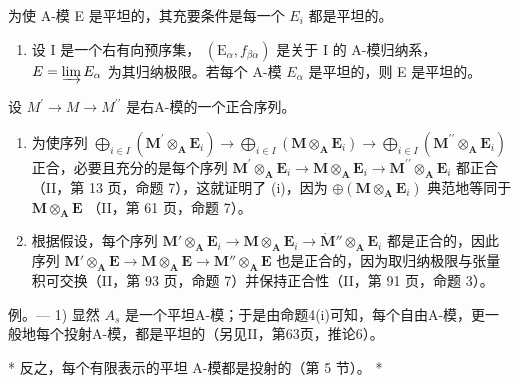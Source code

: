 为使 A-模 E 是平坦的，其充要条件是每一个 \(E_{i}\) 都是平坦的。

\begin{enumerate}
\def\labelenumi{(\roman{enumi})}
\setcounter{enumi}{1}
\tightlist
\item
  设 I 是一个右有向预序集， \((\mathrm{E}_{\alpha}, f_{\beta\alpha})\) 是关于 I 的 A-模归纳系， \(E = \varinjlim E_{\alpha}\) 为其归纳极限。若每个 A-模 \(E_{\alpha}\) 是平坦的，则 E 是平坦的。
\end{enumerate}

设 \(M^{\prime} \rightarrow M \rightarrow M^{\prime\prime}\) 是右A-模的一个正合序列。

\begin{enumerate}
\def\labelenumi{(\roman{enumi})}
\item
  为使序列 \(\bigoplus_{i\in I}(\mathbf{M}^{\prime}\otimes_{\mathbf{A}}\mathbf{E}_{i})\to \bigoplus_{i\in I}(\mathbf{M}\otimes_{\mathbf{A}}\mathbf{E}_{i})\to \bigoplus_{i\in I}(\mathbf{M}^{\prime \prime}\otimes_{\mathbf{A}}\mathbf{E}_{i})\) 正合，必要且充分的是每个序列 \(\mathbf{M}^{\prime}\otimes_{\mathbf{A}}\mathbf{E}_{i}\to \mathbf{M}\otimes_{\mathbf{A}}\mathbf{E}_{i}\to \mathbf{M}^{\prime \prime}\otimes_{\mathbf{A}}\mathbf{E}_{i}\) 都正合（II，第 13 页，命题 7），这就证明了 (i)，因为 \(\oplus (\mathbf{M}\otimes_{\mathbf{A}}\mathbf{E}_{i})\) 典范地等同于 \(\mathbf{M}\otimes_{\mathbf{A}}\mathbf{E}\) （II，第 61 页，命题 7）。
\item
  根据假设，每个序列 \(\mathbf{M}' \otimes_{\mathbf{A}} \mathbf{E}_i \to \mathbf{M} \otimes_{\mathbf{A}} \mathbf{E}_i \to \dot{\mathbf{M}}'' \otimes_{\mathbf{A}} \mathbf{E}_i\) 都是正合的，因此序列 \(\mathbf{M}' \otimes_{\mathbf{A}} \mathbf{E} \to \mathbf{M} \otimes_{\mathbf{A}} \mathbf{E} \to \mathbf{M}'' \otimes_{\mathbf{A}} \mathbf{E}\) 也是正合的，因为取归纳极限与张量积可交换（II，第 93 页，命题 7）并保持正合性（II，第 91 页，命题 3）。
\end{enumerate}

例。--- 1) 显然 \(A_{s}\) 是一个平坦A-模；于是由命题4(i)可知，每个自由A-模，更一般地每个投射A-模，都是平坦的（另见II，第63页，推论6）。

* 反之，每个有限表示的平坦 A-模都是投射的（第 5 节）。 *

